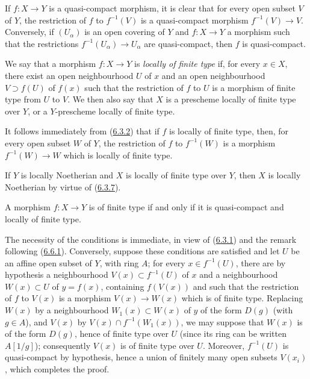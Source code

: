 If $f:X\to Y$ is a quasi-compact morphism, it is clear that for every
open subset $V$ of $Y$, the restriction of $f$ to $f^{-1}(V)$ is a
quasi-compact morphism $f^{-1}(V)\to V$. Conversely, if $(U_\alpha)$ is an
open covering of $Y$ and $f:X\to Y$ a morphism such that the restrictions
$f^{-1}(U_\alpha)\to U_\alpha$ are quasi-compact, then $f$ is
quasi-compact.

\begin{definition}[6.6.2]
\label{I.6.6.2}
We say that a morphism $f:X\to Y$ is \emph{locally of finite type} if, for
every $x\in X$, there exist an open neighbourhood $U$ of $x$ and an open
neighbourhood $V\supset f(U)$ of $f(x)$ such that the
restriction of $f$ to $U$ is a morphism of finite type from $U$ to $V$. We
then also say that $X$ is a prescheme locally of finite type over $Y$, or a
$Y$-prescheme locally of finite type.
\end{definition}

It follows immediately from (\hyperref[I.6.3.2]{6.3.2}) that if $f$ is
locally of finite type, then, for every open subset $W$ of $Y$, the
restriction of $f$ to $f^{-1}(W)$ is a morphism $f^{-1}(W)\to W$ which is
locally of finite type.

If $Y$ is locally Noetherian and $X$ is locally of finite type over
$Y$, then $X$ is locally Noetherian by virtue of
(\hyperref[I.6.3.7]{6.3.7}).

\begin{proposition}[6.6.3]
\label{I.6.6.3}
A morphism $f:X\to Y$ is of finite type if and only if it is quasi-compact and
locally of finite type.
\end{proposition}

The necessity of the conditions is immediate, in view of
(\hyperref[I.6.3.1]{6.3.1}) and the remark following
(\hyperref[I.6.6.1]{6.6.1}). Conversely, suppose these conditions are
satisfied and let $U$ be an affine open subset of $Y$, with ring $A$; for every
$x\in f^{-1}(U)$, there are by hypothesis a neighbourhood
$V(x)\subset f^{-1}(U)$ of $x$ and a neighbourhood $W(x)\subset U$ of
$y=f(x)$, containing $f(V(x))$ and such that the restriction of $f$ to $V(x)$
is a morphism $V(x)\to W(x)$ which is of finite type. Replacing $W(x)$ by a
neighbourhood $W_1(x)\subset W(x)$ of $y$ of the form $D(g)$ (with $g\in A$),
and $V(x)$ by $V(x)\cap f^{-1}(W_1(x))$, we may suppose that $W(x)$ is of the
form $D(g)$, hence of finite type over $U$ (since its ring can be written
$A[1/g]$); consequently $V(x)$ is of finite type over $U$. Moreover,
$f^{-1}(U)$ is quasi-compact by hypothesis, hence a union of finitely many
open subsets $V(x_i)$, which completes the proof.

